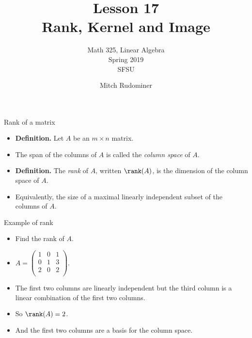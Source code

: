 \documentclass{beamer}
\title{Lesson 17 \\ Rank, Kernel and Image}
\subtitle{Math 325, Linear Algebra \\ Spring 2019 \\ SFSU}
\author{Mitch Rudominer}
\date{}
\begin{document}
\begin{frame}
  \titlepage
\end{frame}


\begin{frame}{Rank of a matrix}

\begin{itemize}
\item \textbf{Definition.} Let $A$ be an $m\times n$ matrix.
\item The span of the columns of $A$ is called the \emph{column space} of $A$.
\item \textbf{Definition.} The \emph{rank} of $A$, written $\rank(A)$,
is the dimension of the column space of $A$.\
\item Equivalently, the size of a maximal linearly independent subset of
the columns of $A$.
\end{itemize}
\end{frame}

\begin{frame}{Example of rank}

\begin{itemize}
\item Find the rank of $A$.
\item $A=
\begin{pmatrix}
1  & 0  & 1 \\
0  & 1  & 3 \\
2  & 0  & 2 \\
\end{pmatrix}
$.
\item The first two columns are linearly independent but the third column
is a linear combination of the first two columns.
\item So $\rank(A) = 2$.
\item And the first two columns are a basis for the column space.
\end{itemize}


\end{frame}

\end{document}
